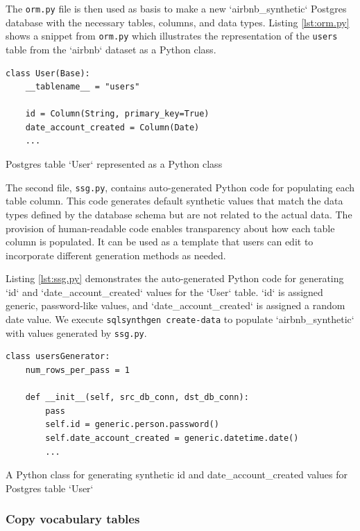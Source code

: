 \documentclass[11pt]{article}
\begin{document}
The \texttt{orm.py} file is then used as basis to make a new `airbnb\_synthetic` Postgres database with the necessary tables, columns, and data types. Listing \ref{lst:orm.py} shows a snippet from \texttt{orm.py} which illustrates the representation of the \texttt{users} table from the `airbnb`  dataset as a Python class.

\begin{listing}[H]
\begin{verbatim}
class User(Base):
    __tablename__ = "users"

    id = Column(String, primary_key=True)
    date_account_created = Column(Date)
    ...
\end{verbatim}
\caption{Postgres table `User` represented as a Python class}
\label{lst:orm.py}
\end{listing}

The second file, \texttt{ssg.py}, contains auto-generated Python code for populating each table column. This code generates default synthetic values that match the data types defined by the database schema but are not related to the actual data. The provision of human-readable code enables transparency about how each table column is populated. It can be used as a template that users can edit to incorporate different generation methods as needed.

Listing \ref{lst:ssg.py} demonstrates the auto-generated Python code for generating `id` and `date\_account\_created` values for the `User` table. `id` is assigned generic, password-like values, and `date\_account\_created` is assigned a random date value. We execute \texttt{sqlsynthgen create-data} to populate `airbnb\_synthetic` with values generated by \texttt{ssg.py}.

\begin{listing}[H]
\begin{verbatim}
class usersGenerator:
    num_rows_per_pass = 1

    def __init__(self, src_db_conn, dst_db_conn):
        pass
        self.id = generic.person.password()
        self.date_account_created = generic.datetime.date()
        ...
\end{verbatim}
\caption{A Python class for generating synthetic id and date\_account\_created values for Postgres table `User`}
\label{lst:ssg.py}
\end{listing}

\subsubsection{Copy vocabulary tables}
\end{document}
